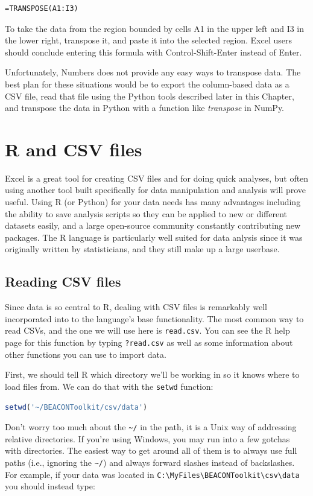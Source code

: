 \begin{lstlisting}
=TRANSPOSE(A1:I3)
\end{lstlisting}
To take the data from the region bounded by cells A1 in the upper left
and I3 in the lower right, transpose it, and paste it into the selected
region. Excel users should conclude entering this formula with
Control-Shift-Enter instead of Enter.

Unfortunately, Numbers does not provide any easy ways to transpose data.
The best plan for these situations would be to export the column-based
data as a CSV file, read that file using the Python tools described
later in this Chapter, and transpose the data in Python with a function
like \emph{transpose} in NumPy.

\section{R and CSV files}

Excel is a great tool for creating CSV files and for doing quick
analyses, but often using another tool built specifically for data
manipulation and analysis will prove useful. Using R (or Python) for
your data needs has many advantages including the ability to save
analysis scripts so they can be applied to new or different datasets
easily, and a large open-source community constantly contributing new
packages. The R language is particularly well suited for data anlysis
since it was originally written by statisticians, and they still make up
a large userbase.

\subsection{Reading CSV files}

Since data is so central to R, dealing with CSV files is remarkably well
incorporated into to the language's base functionality. The most common
way to read CSVs, and the one we will use here is \lstinline!read.csv!.
You can see the R help page for this function by typing
\lstinline!?read.csv! as well as some information about other functions
you can use to import data.

First, we should tell R which directory we'll be working in so it knows
where to load files from. We can do that with the \lstinline!setwd!
function:

\begin{lstlisting}[language=R]
setwd('~/BEACONToolkit/csv/data')
\end{lstlisting}
Don't worry too much about the \lstinline!~/! in the path, it is a Unix
way of addressing relative directories. If you're using Windows, you may
run into a few gotchas with directories. The easiest way to get around
all of them is to always use full paths (i.e., ignoring the
\lstinline!~/!) and always forward slashes instead of backslashes. For
example, if your data was located in
\lstinline!C:\MyFiles\BEACONToolkit\csv\data! you should instead type:

